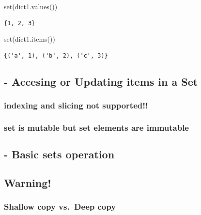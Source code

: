 \documentclass[
  letterpaper,
  DIV=11,
  numbers=noendperiod]{scrreprt}
\newenvironment{Shaded}{\begin{snugshade}}{\end{snugshade}}
\newcommand{\BuiltInTok}[1]{\textcolor[rgb]{0.00,0.23,0.31}{#1}}
\newcommand{\NormalTok}[1]{\textcolor[rgb]{0.00,0.23,0.31}{#1}}
\begin{document}
\begin{Shaded}
\begin{Highlighting}[]
\BuiltInTok{set}\NormalTok{(dict1.values())}
\end{Highlighting}
\end{Shaded}

\begin{verbatim}
{1, 2, 3}
\end{verbatim}

\begin{Shaded}
\begin{Highlighting}[]
\BuiltInTok{set}\NormalTok{(dict1.items())}
\end{Highlighting}
\end{Shaded}

\begin{verbatim}
{('a', 1), ('b', 2), ('c', 3)}
\end{verbatim}

\subsection{- Accesing or Updating items in a
Set}\label{accesing-or-updating-items-in-a-set}

\subsubsection{indexing and slicing not
supported!!}\label{indexing-and-slicing-not-supported}

\subsubsection{set is mutable but set elements are
immutable}\label{set-is-mutable-but-set-elements-are-immutable}

\subsection{- Basic sets operation}\label{basic-sets-operation}

\subsection{Warning!}\label{warning}

\subsubsection{Shallow copy vs.~Deep
copy}\label{shallow-copy-vs.-deep-copy}
\end{document}
